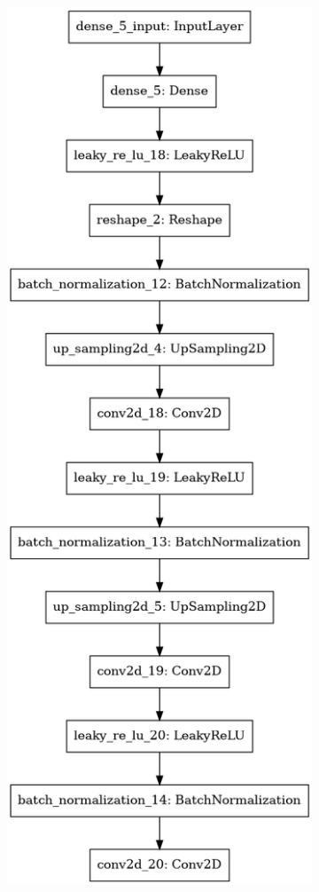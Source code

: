 \documentclass[13pt]{article}
\begin{document}
\begin{figure}
    \centering
    \begin{subfigure}[b]{0.36\textwidth}
        \includegraphics[width=\textwidth]{plots/generator.png}

\end{subfigure}
\end{figure}
\end{document}
